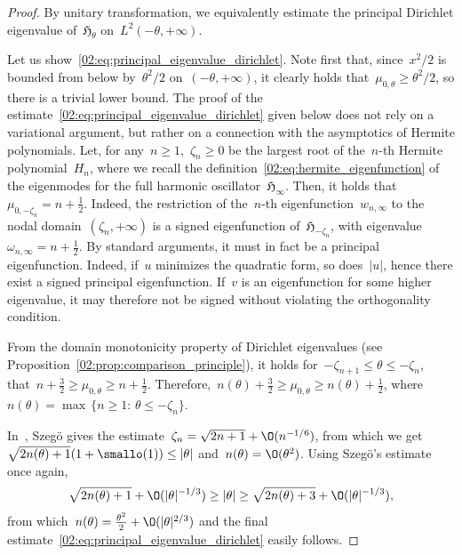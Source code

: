     \begin{proof}
        By unitary transformation, we equivalently estimate the principal Dirichlet eigenvalue of~$\mathfrak{H}_\theta$ on~$L^2(-\theta,+\infty)$. 
        
        Let us show~\eqref{02:eq:principal_eigenvalue_dirichlet}. Note first that, since~$x^2/2$ is bounded from below by~$\theta^2/2$ on~$(-\theta,+\infty)$, it clearly holds that~$\mu_{0,\theta}\geq \theta^2/2$, so there is a trivial lower bound. The proof of the estimate~\ref{02:eq:principal_eigenvalue_dirichlet} given below does not rely on a variational argument, but rather on a connection with the asymptotics of Hermite polynomials.
        Let, for any~$n\geq 1$,~$\zeta_n \geq 0$ be the largest root of the~$n$-th Hermite polynomial~$H_n$, where we recall the definition~\eqref{02:eq:hermite_eigenfunction} of the eigenmodes for the full harmonic oscillator~$\mathfrak{H}_\infty$.
        Then, it holds that~$\mu_{0,-\zeta_n} = n + \frac12$. Indeed, the restriction of the~$n$-th eigenfunction~$w_{n,\infty}$ to the nodal domain~$(\zeta_n,+\infty)$ is a signed eigenfunction of~$\mathfrak{H}_{-\zeta_n}$, with eigenvalue~$\omega_{n,\infty}=n+\frac12$. By standard arguments, it must in fact be a principal eigenfunction. Indeed, if~$u$ minimizes the quadratic form, so does~$|u|$, hence there exist a signed principal eigenfunction. If~$v$ is an eigenfunction for some higher eigenvalue, it may therefore not be signed without violating the orthogonality condition.

        From the domain monotonicity property of Dirichlet eigenvalues (see Proposition~\ref{02:prop:comparison_principle}), it holds for~$ -\zeta_{n+1}\leq \theta\leq -\zeta_{n}$, that~$ n + \frac32\geq \mu_{0,\theta}\geq n+\frac12$. Therefore,~$ n(\theta)+\frac32\geq\mu_{0,\theta}\geq n(\theta) + \frac12$, where~$n(\theta) = \max\,\{n\geq 1:\,\theta\leq -\zeta_n \}$.
        
        In~\cite[Theorem 6.32]{S39}, Szeg\"o gives the estimate~$\zeta_n = \sqrt{2n+1} + \O(n^{-1/6})$, from which we get\newline
        ~${\sqrt{2n(\theta)+1}(1+\smallo(1))\leq |\theta|}$ and~$n(\theta)=\O(\theta^2)$. Using Szeg\"o's estimate once again,
        \[\sqrt{2n(\theta)+1}+ \O(|\theta|^{-1/3})\geq |\theta|\geq \sqrt{2n(\theta)+3} + \O(|\theta|^{-1/3}),\]
        from which~$n(\theta) = \frac{\theta^2}2 + \O(|\theta|^{2/3})$ and the final estimate~\eqref{02:eq:principal_eigenvalue_dirichlet} easily follows.


\end{proof}
